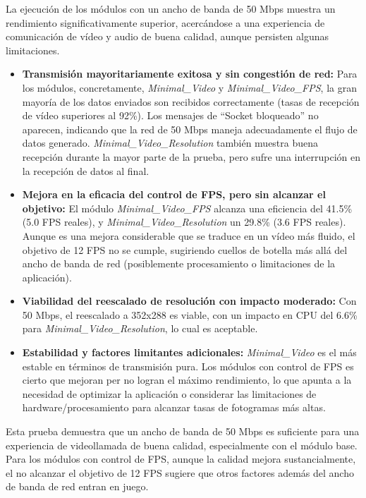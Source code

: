 La ejecución de los módulos con un ancho de banda de 50 Mbps muestra un rendimiento significativamente superior, acercándose a una experiencia de comunicación de vídeo y audio de buena calidad, aunque persisten algunas limitaciones.
\begin{itemize}
\item \textbf{Transmisión mayoritariamente exitosa y sin congestión de red:} Para los módulos, concretamente, \textit{Minimal\_Video} y \textit{Minimal\_Video\_FPS}, la gran mayoría de los datos enviados son recibidos correctamente (tasas de recepción de vídeo superiores al 92\%). Los mensajes de ``Socket bloqueado'' no aparecen, indicando que la red de 50 Mbps maneja adecuadamente el flujo de datos generado. \textit{Minimal\_Video\_Resolution} también muestra buena recepción durante la mayor parte de la prueba, pero sufre una interrupción en la recepción de datos al final.
\item \textbf{Mejora en la eficacia del control de FPS, pero sin alcanzar el objetivo:} El módulo \textit{Minimal\_Video\_FPS} alcanza una eficiencia del 41.5\% (5.0 FPS reales), y \textit{Minimal\_Video\_Resolution} un 29.8\% (3.6 FPS reales). Aunque es una mejora considerable que se traduce en un vídeo más fluido, el objetivo de 12 FPS no se cumple, sugiriendo cuellos de botella más allá del ancho de banda de red (posiblemente procesamiento o limitaciones de la aplicación).
\item \textbf{Viabilidad del reescalado de resolución con impacto moderado:} Con 50 Mbps, el reescalado a 352x288 es viable, con un impacto en CPU del 6.6\% para \textit{Minimal\_Video\_Resolution}, lo cual es aceptable.
\item \textbf{Estabilidad y factores limitantes adicionales:} \textit{Minimal\_Video} es el más estable en términos de transmisión pura. Los módulos con control de FPS es cierto que mejoran per no logran el máximo rendimiento, lo que apunta a la necesidad de optimizar la aplicación o considerar las limitaciones de hardware/procesamiento para alcanzar tasas de fotogramas más altas. 
\end{itemize}

Esta prueba demuestra que un ancho de banda de 50 Mbps es suficiente para una experiencia de videollamada de buena calidad, especialmente con el módulo base. Para los módulos con control de FPS, aunque la calidad mejora sustancialmente, el no alcanzar el objetivo de 12 FPS sugiere que otros factores además del ancho de banda de red entran en juego.
\newpage

